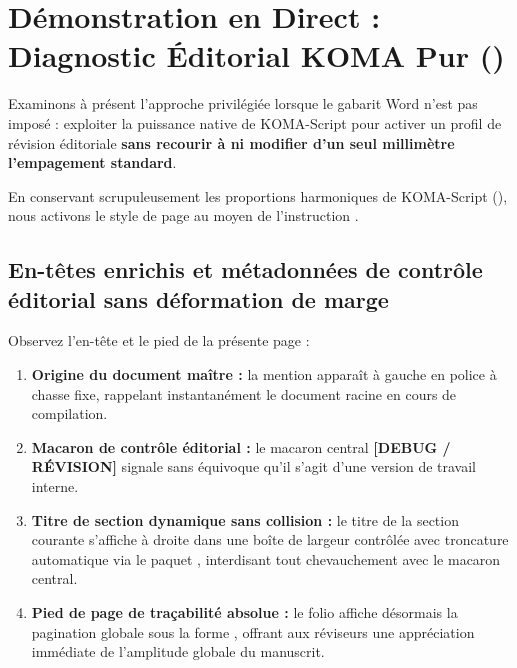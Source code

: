 \activerStyleDebug

\section[Diagnostic Éditorial KOMA \& ThesisDebug]{Démonstration en Direct : Diagnostic Éditorial KOMA Pur ()}
\label{sec:demo-geometrie-annotation}

Examinons à présent l'approche privilégiée lorsque le gabarit Word n'est pas imposé :
exploiter la puissance native de KOMA-Script pour activer un profil de révision éditoriale
\textbf{sans recourir à  ni modifier d'un seul millimètre l'empagement standard}.

En conservant scrupuleusement les proportions harmoniques de KOMA-Script (),
nous activons le style de page 
au moyen de l'instruction .

\subsection{En-têtes enrichis et métadonnées de contrôle éditorial sans déformation de marge}
Observez l'en-tête et le pied de la présente page :
\begin{enumerate}
  \item \textbf{Origine du document maître :} la mention  apparaît à gauche en police à chasse fixe,
  rappelant instantanément le document racine en cours de compilation.
  \item \textbf{Macaron de contrôle éditorial :} le macaron central \textbf{\textcolor{ThesisAccent}{[DEBUG / RÉVISION]}}
  signale sans équivoque qu'il s'agit d'une version de travail interne.
  \item \textbf{Titre de section dynamique sans collision :}
  le titre de la section courante s'affiche à droite dans une boîte de largeur contrôlée avec troncature automatique
  via le paquet , interdisant tout chevauchement avec le macaron central.
  \item \textbf{Pied de page de traçabilité absolue :}
  le folio affiche désormais la pagination globale sous la forme ,
  offrant aux réviseurs une appréciation immédiate de l'amplitude globale du manuscrit.
\end{enumerate}

